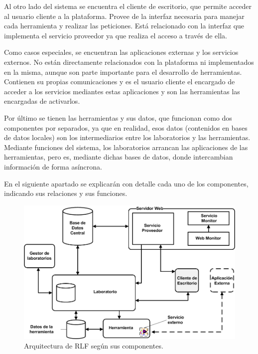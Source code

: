 Al otro lado del sistema se encuentra el cliente de escritorio, que 
permite acceder al usuario cliente a la plataforma. Provee de la 
interfaz necesaria para manejar cada herramienta y realizar las 
peticiones. Está relacionado con la interfaz que implementa el 
servicio proveedor ya que realiza el acceso a través de ella.

Como casos especiales, se encuentran las aplicaciones externas y los 
servicios externos. No están directamente relacionados con la 
plataforma ni implementados en la misma, aunque son parte importante 
para el desarrollo de herramientas. Contienen su propias 
comunicaciones y es el usuario cliente el encargado de acceder a los 
servicios mediantes estas aplicaciones y son las herramientas las 
encargadas de activarlos.

Por último se tienen las herramientas y sus datos, que funcionan como 
dos componentes por separados, ya que en realidad, esos datos 
(contenidos en bases de datos locales) son los intermediarios entre 
los laboratorios y las herramientas. Mediante funciones del sistema, 
los laboratorios arrancan las aplicaciones de las herramientas, pero 
es, mediante dichas bases de datos, donde intercambian información de 
forma asíncrona.

En el siguiente apartado se explicarán con detalle cada uno de los 
componentes, indicando sus relaciones y sus funciones.

\begin{figure}[h]
	\centering
	\includegraphics[angle=90,scale=0.7]{images/arquitectura.png}
	\caption[Arquitectura de RLF]{Arquitectura de RLF según sus 
	componentes.}
	\label{fig:arquitectura}
\end{figure}

\clearpage

